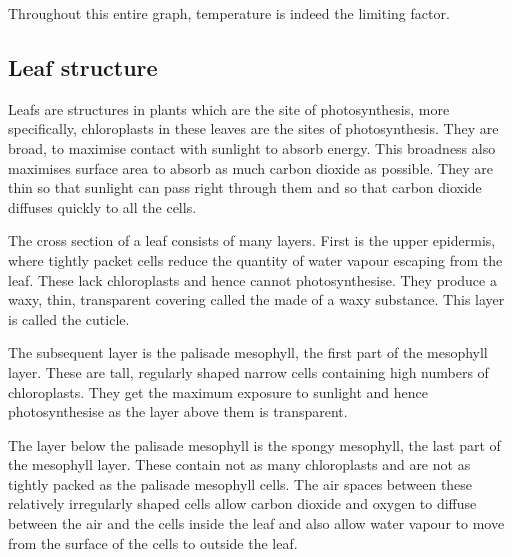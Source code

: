 \begin{center}
\end{center}

Throughout this entire graph, temperature is indeed the limiting factor.

\subsection{Leaf structure}

Leafs are structures in plants which are the site of photosynthesis,
more specifically, chloroplasts in these leaves are the sites of photosynthesis. They are broad, 
to maximise
contact with sunlight to absorb energy. This broadness also maximises surface area to absorb
as much carbon dioxide as possible.
They are thin so that sunlight can pass right through them
and so that carbon dioxide diffuses quickly to all the cells.

The cross section of a leaf consists of many layers. First is the upper epidermis, where tightly
packet cells reduce the quantity of water vapour escaping from the leaf. These lack chloroplasts and
hence cannot photosynthesise. They produce a waxy, thin, transparent covering called the made of
a waxy substance. This layer is called the cuticle.

The subsequent layer is the palisade mesophyll, the first part of the mesophyll layer. These are
tall, regularly shaped narrow cells containing high numbers of chloroplasts. They get the maximum
exposure to sunlight and hence photosynthesise as the layer above them is transparent.

The layer below the palisade mesophyll is the spongy mesophyll, the last part of the mesophyll layer.
These contain not as many chloroplasts and are not as tightly packed as the palisade mesophyll cells.
The air spaces between these relatively irregularly shaped cells allow carbon dioxide and oxygen
to diffuse between the air and the cells inside the leaf and also allow water vapour to move from
the surface of the cells to outside the leaf.

